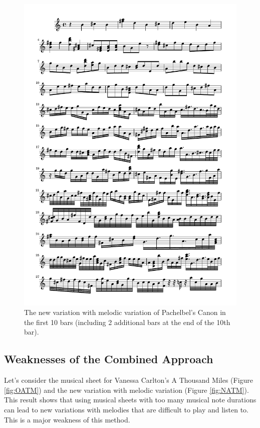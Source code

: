 \documentclass[11pt]{article}
\theoremstyle{definition}
\begin{document}
\begin{figure}
\centering
\includegraphics[trim=1cm 20.3cm 1cm 0.5cm, clip, scale=0.6]{New_CND.pdf}
\caption{The new variation with melodic variation of Pachelbel's Canon in the first 10 bars (including 2 additional bars at the end of the 10th bar).} 
\label{fig:NCND}
\end{figure}

\subsection{Weaknesses of the Combined Approach}

Let's consider the musical sheet for Vanessa Carlton's A Thousand Miles (Figure \ref{fig:OATM}) and the new variation with melodic variation (Figure \ref{fig:NATM}). This result shows that using musical sheets with too many musical note durations can lead to new variations with melodies that are difficult to play and listen to. This is a major weakness of this method.
\end{document}
